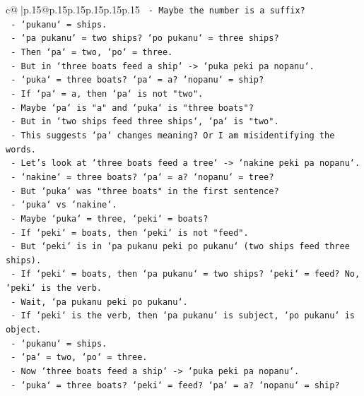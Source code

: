 \documentclass{article}
\begin{document}
{\begin{supertabular}{c@{$\;$}|p{.15\linewidth}@{}p{.15\linewidth}p{.15\linewidth}p{.15\linewidth}p{.15\linewidth}p{.15\linewidth}}
{{{\texttt{  {-} Maybe the number is a suffix?} \\
\texttt{  {-} `pukanu` = ships.} \\
\texttt{  {-} `pa pukanu` = two ships? `po pukanu` = three ships?} \\
\texttt{  {-} Then `pa` = two, `po` = three.} \\
\texttt{  {-} But in `three boats feed a ship` {-}> `puka peki pa nopanu`.} \\
\texttt{    {-} `puka` = three boats? `pa` = a? `nopanu` = ship?} \\
\texttt{    {-} If `pa` = a, then `pa` is not "two".} \\
\texttt{    {-} Maybe `pa` is "a" and `puka` is "three boats"?} \\
\texttt{    {-} But in `two ships feed three ships`, `pa` is "two".} \\
\texttt{    {-} This suggests `pa` changes meaning? Or I am misidentifying the words.} \\
\texttt{    {-} Let's look at `three boats feed a tree` {-}> `nakine peki pa nopanu`.} \\
\texttt{      {-} `nakine` = three boats? `pa` = a? `nopanu` = tree?} \\
\texttt{      {-} But `puka` was "three boats" in the first sentence?} \\
\texttt{      {-} `puka` vs `nakine`.} \\
\texttt{      {-} Maybe `puka` = three, `peki` = boats?} \\
\texttt{      {-} If `peki` = boats, then `peki` is not "feed".} \\
\texttt{      {-} But `peki` is in `pa pukanu peki po pukanu` (two ships feed three ships).} \\
\texttt{      {-} If `peki` = boats, then `pa pukanu` = two ships? `peki` = feed? No, `peki` is the verb.} \\
\texttt{      {-} Wait, `pa pukanu peki po pukanu`.} \\
\texttt{      {-} If `peki` is the verb, then `pa pukanu` is subject, `po pukanu` is object.} \\
\texttt{      {-} `pukanu` = ships.} \\
\texttt{      {-} `pa` = two, `po` = three.} \\
\texttt{      {-} Now `three boats feed a ship` {-}> `puka peki pa nopanu`.} \\
\texttt{        {-} `puka` = three boats? `peki` = feed? `pa` = a? `nopanu` = ship?} \\
}}}
\end{supertabular}}
\end{document}
